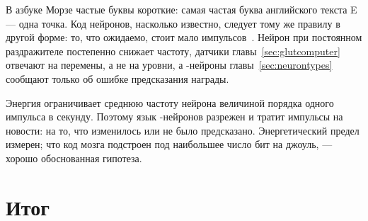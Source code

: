 В азбуке Морзе частые буквы короткие: самая частая буква английского текста E --- одна точка. Код нейронов, насколько известно, следует тому же правилу в другой форме: то, что ожидаемо, стоит мало импульсов~\cite{Barlow1961}. Нейрон при постоянном раздражителе постепенно снижает частоту, датчики главы~\ref{sec:glutcomputer} отвечают на перемены, а не на уровни, а -нейроны главы~\ref{sec:neurontypes} сообщают только об ошибке предсказания награды.

\begin{keyblock}
\begin{proposition}[Экономия]
\label{prop:economy}
Энергия ограничивает среднюю частоту нейрона величиной порядка одного импульса в секунду. Поэтому язык -нейронов разрежен и тратит импульсы на новости: на то, что изменилось или не было предсказано. Энергетический предел измерен; что код мозга подстроен под наибольшее число бит на джоуль, --- хорошо обоснованная гипотеза.
\end{proposition}
\end{keyblock}

\section{Итог}


